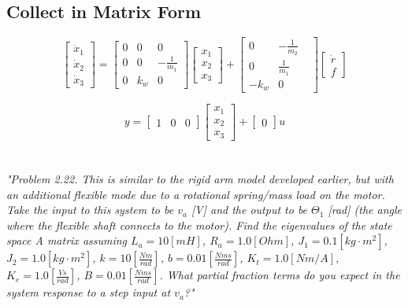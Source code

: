 \documentclass{article}
\begin{document}
\subsection{Collect in Matrix Form}
   
\[
\begin{bmatrix}
\dot{x}_1 \\
\dot{x}_2 \\
\dot{x}_3 
\end{bmatrix}
=
\begin{bmatrix}
0 & 0 & 0 \\
0 & 0 & -\frac{1}{m_1} \\
0 & k_w & 0  
\end{bmatrix}
\begin{bmatrix}
x_1 \\
x_2 \\
x_3 
\end{bmatrix}
+
\begin{bmatrix}
0 & -\frac{1}{m_2}\\
0 & \frac{1}{m_1} \\
-k_w & 0& 
\end{bmatrix}
\begin{bmatrix}
\dot{r} \\
f
\end{bmatrix}
\]

\[
y = 
\begin{bmatrix}
1 & 0 & 0
\end{bmatrix}
\begin{bmatrix}
x_1 \\
x_2 \\
x_3 
\end{bmatrix}
+
\begin{bmatrix}
0
\end{bmatrix}
u
\]

\section{}

\textit{
    "Problem 2.22. This is similar to the rigid arm model developed earlier, but with an
    additional flexible mode due to a rotational spring/mass load on the motor. Take the input
    to this system to be $v_a$ [V] and the output to be $\Theta_1$ [rad] (the angle where the flexible
    shaft connects to the motor). Find the eigenvalues of the state space A matrix assuming
    $L_a = 10 [mH]$, $R_a = 1.0 [Ohm]$, $J_1 = 0.1 [kg \cdot m^2]$, $J_2 = 1.0 [kg \cdot m^2]$, $k = 10 [\frac{Nm}{rad}]$,
    $b = 0.01 [\frac{Nms}{rad}]$, $K_t = 1.0 [Nm/A]$, $K_e = 1.0 [\frac{Vs}{rad}]$, $B = 0.01 [\frac{Nms}{rad}]$. What partial
    fraction terms do you expect in the system response to a step input at $v_a$?"
}
\end{document}
